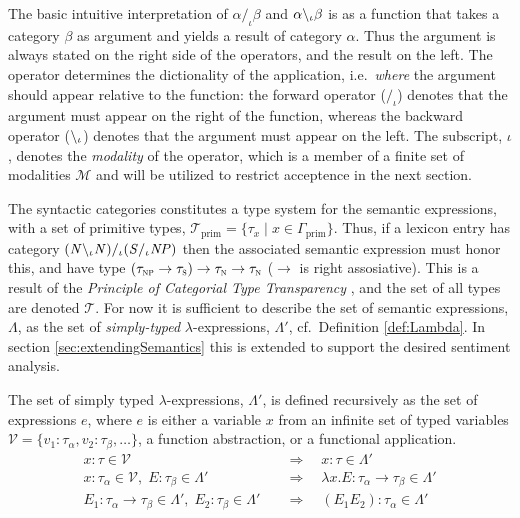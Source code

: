 The basic intuitive interpretation of $\alpha /_\iota \beta$ and $\alpha \backslash_\iota \beta$ is as a function that takes a category $\beta$ as argument and yields a result of category $\alpha$. Thus the argument is always stated on the right side of the operators, and the result on the left. The operator determines the dictionality of the application, i.e.\ \emph{where} the argument should appear relative to the function: the forward operator ($/_\iota$) denotes that the argument must appear on the right of the function, whereas the backward operator ($\backslash_\iota$) denotes that the argument must appear on the left. The subscript, $\iota$, denotes the \emph{modality} of the operator, which is a member of a finite set of modalities $\mathcal{M}$ and will be utilized to restrict acceptence in the next section. 

The syntactic categories constitutes a type system for the semantic expressions, with a set of primitive types, $\mathcal{T}_\mathrm{prim} = \{ \tau_x \; | \; x \in \Gamma_\mathrm{prim} \}$. Thus, if a lexicon entry has category $({\mathit{N}} \backslash_\iota {\mathit{N}}) /_\iota ({\mathit{S}} /_\iota {\mathit{NP}})$ then the associated semantic expression must honor this, and have type $(\tau_\textsc{np} \to \tau_\textsc{s}) \to \tau_\textsc{n} \to \tau_\textsc{n}$ ($\to$ is right assosiative). This is a result of the \emph{Principle of Categorial Type Transparency} \cite[Montague, 1974]{??}, and the set of all types are denoted $\mathcal{T}$. For now it is sufficient to describe the set of semantic expressions, $\Lambda$, as the set of \emph{simply-typed} $\lambda$-expressions, $\Lambda'$, cf.\ Definition \ref{def:Lambda}. In section \ref{sec:extendingSemantics} this is extended to support the desired sentiment analysis.

\begin{definition}
The set of simply typed $\lambda$-expressions, $\Lambda'$, is defined recursively as the set of expressions $e$, where $e$ is either a variable $x$ from an infinite set of typed variables $\mathcal{V} = \{ v_1 : \tau_\alpha, v_2 : \tau_\beta, \ldots \}$, a function abstraction, or a functional application.
\begin{align}
 x : \tau \in \mathcal{V}                      &\quad \Rightarrow \quad  x  : \tau \in \Lambda' \tag{Variable} \\
 x : \tau_\alpha \in \mathcal{V}, \; E : \tau_\beta \in \Lambda'          &\quad \Rightarrow \quad  \lambda x . E : \tau_\alpha \to \tau_\beta \in \Lambda' \tag{Abstraction} \\
 E_1 : \tau_\alpha \to \tau_\beta \in \Lambda', \; E_2 : \tau_\beta \in \Lambda'   &\quad \Rightarrow \quad  (E_1 E_2) : \tau_\alpha \in \Lambda' \tag{Application} 
 \label{eq:Lambda}
\end{align}
\label{def:Lambda}
\done
\end{definition}

